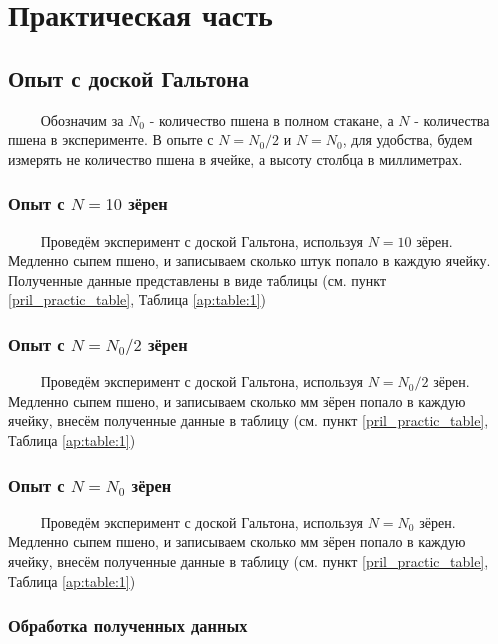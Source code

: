 \section{Практическая часть}



\subsection{Опыт с доской Гальтона}

$\qquad$ Обозначим за $N_0$ - количество пшена в полном стакане, а $N$ - количества пшена в эксперименте. В опыте с $N = N_0 / 2$ и $N = N_0$, для удобства, будем измерять не количество пшена в ячейке, а высоту столбца в миллиметрах.
	
\subsubsection{Опыт с $N = 10$ зёрен}

$\qquad$ Проведём эксперимент с доской Гальтона, используя $N = 10$ зёрен. Медленно сыпем пшено, и записываем сколько штук попало в каждую ячейку. Полученные данные представлены в виде таблицы (см. пункт \ref{pril_practic_table}, Таблица \ref{ap:table:1})

\subsubsection{Опыт с $N = N_0 / 2$ зёрен}

$\qquad$ Проведём эксперимент с доской Гальтона, используя $N = N_0 / 2$ зёрен. Медленно сыпем пшено, и записываем сколько мм зёрен попало в каждую ячейку, внесём полученные данные в таблицу (см. пункт \ref{pril_practic_table}, Таблица \ref{ap:table:1})


\subsubsection{Опыт с $N = N_0$ зёрен} 

$\qquad$ Проведём эксперимент с доской Гальтона, используя $N = N_0$ зёрен. Медленно сыпем пшено, и записываем сколько мм зёрен попало в каждую ячейку, внесём полученные данные в таблицу (см. пункт \ref{pril_practic_table}, Таблица \ref{ap:table:1})

\subsubsection{Обработка полученных данных}

